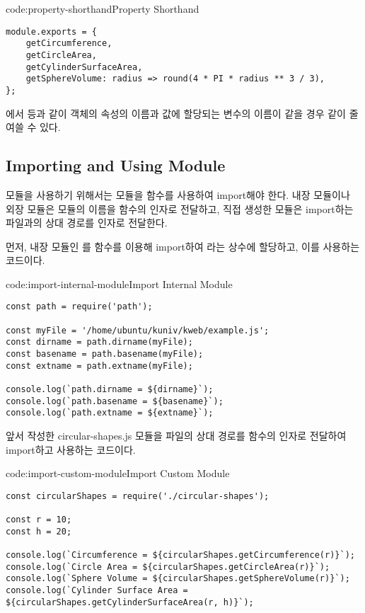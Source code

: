 \begin{codeenv}{code:property-shorthand}{Property Shorthand}\begin{verbatim}
module.exports = {
    getCircumference,
    getCircleArea,
    getCylinderSurfaceArea,
    getSphereVolume: radius => round(4 * PI * radius ** 3 / 3),
};
\end{verbatim}
\end{codeenv}

에서  등과 같이 객체의 속성의 이름과 값에 할당되는 변수의 이름이 같을 경우 \와 같이 줄여쓸 수 있다.
\newpage

\subsection*{Importing and Using Module}

모듈을 사용하기 위해서는 모듈을  함수를 사용하여 import해야 한다. 내장 모듈이나 외장 모듈은 모듈의 이름을  함수의 인자로 전달하고, 직접 생성한 모듈은 import하는 파일과의 상대 경로를 인자로 전달한다.

먼저, \은 내장 모듈인 를  함수를 이용해 import하여 라는 상수에 할당하고, 이를 사용하는 코드이다.

\begin{codeenv}{code:import-internal-module}{Import Internal Module}\begin{verbatim}
const path = require('path');

const myFile = '/home/ubuntu/kuniv/kweb/example.js';
const dirname = path.dirname(myFile);
const basename = path.basename(myFile);
const extname = path.extname(myFile);

console.log(`path.dirname = ${dirname}`);
console.log(`path.basename = ${basename}`);
console.log(`path.extname = ${extname}`);
\end{verbatim}
\end{codeenv}

\은 앞서 작성한 circular-shapes.js 모듈을 파일의 상대 경로를  함수의 인자로 전달하여 import하고 사용하는 코드이다.

\begin{codeenv}{code:import-custom-module}{Import Custom Module }\begin{verbatim}
const circularShapes = require('./circular-shapes');

const r = 10;
const h = 20;

console.log(`Circumference = ${circularShapes.getCircumference(r)}`);
console.log(`Circle Area = ${circularShapes.getCircleArea(r)}`);
console.log(`Sphere Volume = ${circularShapes.getSphereVolume(r)}`);
console.log(`Cylinder Surface Area = ${circularShapes.getCylinderSurfaceArea(r, h)}`);    
\end{verbatim}
\end{codeenv}

